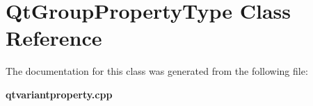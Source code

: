 \section{Qt\+Group\+Property\+Type Class Reference}
\label{classQtGroupPropertyType}


The documentation for this class was generated from the following file\+:\begin{DoxyCompactItemize}
\item 
{\bf qtvariantproperty.\+cpp}\end{DoxyCompactItemize}
